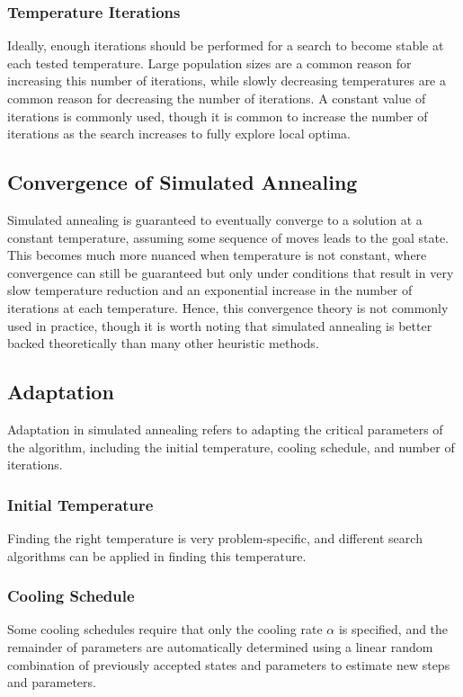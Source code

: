 \documentclass[12pt,titlepage]{article}
\begin{document}
      \subsubsection{Temperature Iterations}
        Ideally, enough iterations should be performed for a search to become stable at each tested temperature. Large population sizes are a common reason for increasing this number
        of iterations, while slowly decreasing temperatures are a common reason for decreasing the number of iterations. A constant value of iterations is commonly used, though
        it is common to increase the number of iterations as the search increases to fully explore local optima.

    \subsection{Convergence of Simulated Annealing}
      Simulated annealing is guaranteed to eventually converge to a solution at a constant temperature, assuming some sequence of moves leads to the goal state. This becomes much
      more nuanced when temperature is not constant, where convergence can still be guaranteed but only under conditions that result in very slow temperature reduction and an
      exponential increase in the number of iterations at each temperature. Hence, this convergence theory is not commonly used in practice, though it is worth noting that
      simulated annealing is better backed theoretically than many other heuristic methods.

    \subsection{Adaptation}
      Adaptation in simulated annealing refers to adapting the critical parameters of the algorithm, including the initial temperature, cooling schedule, and number of iterations.

      \subsubsection{Initial Temperature}
        Finding the right temperature is very problem-specific, and different search algorithms can be applied in finding this temperature.

      \subsubsection{Cooling Schedule}
        Some cooling schedules require that only the cooling rate $\alpha$ is specified, and the remainder of parameters are automatically determined using a linear random combination
        of previously accepted states and parameters to estimate new steps and parameters.
\end{document}
